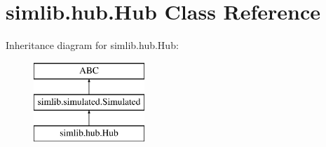 \hypertarget{classsimlib_1_1hub_1_1_hub}{}\section{simlib.\+hub.\+Hub Class Reference}
\label{classsimlib_1_1hub_1_1_hub}
Inheritance diagram for simlib.\+hub.\+Hub\+:\begin{figure}[H]
\begin{center}
\leavevmode
\includegraphics[height=3.000000cm]{classsimlib_1_1hub_1_1_hub}
\end{center}
\end{figure}
